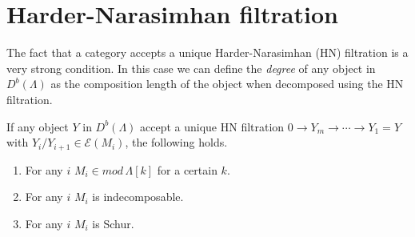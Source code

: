 \section{Harder-Narasimhan filtration}
\indent The fact that a category accepts a unique Harder-Narasimhan (HN) filtration is a very strong condition. In this case we can define the \textit{degree} of any object in $D^b(\Lambda)$ as the composition length of the object when decomposed using the HN filtration.\\
\begin{lemma}
If any object $Y$ in $D^b(\Lambda)$ accept a unique HN filtration $0\to Y_m\to\cdots\to Y_1=Y$ with $Y_i/Y_{i+1}\in \mathcal{E}(M_i)$, the following holds.
\begin{enumerate}
\item For any $i$ $M_i\in mod\, \Lambda[k]$ for a certain $k$.
\item For any $i$ $M_i$ is indecomposable.
\item For any $i$ $M_i$ is Schur.
\end{enumerate}
\end{lemma}
